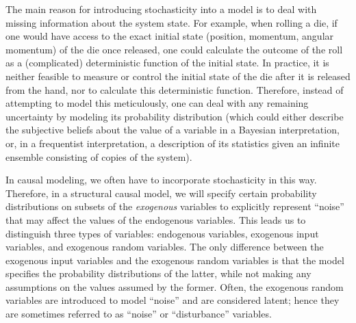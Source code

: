The main reason for introducing stochasticity into a model is to deal with
missing information about the system state. For example, when
rolling a die, if one would have access to the exact initial state (position, momentum,
angular momentum) of the die once released, one could calculate the outcome of the 
roll as a (complicated) deterministic function of the initial state. In
practice, it is neither feasible to measure or control the initial state of the die
after it is released from the hand, nor to calculate this deterministic function. 
Therefore, instead of attempting to model this
meticulously, one can deal with any remaining uncertainty by modeling its probability distribution
(which could either describe the subjective beliefs about the value of a variable
in a Bayesian interpretation, or, in a frequentist interpretation, a description of 
its statistics given an infinite ensemble consisting of copies of the system). 

In causal modeling, we often have to 
incorporate stochasticity in this way. Therefore, in a structural causal model,
we will specify certain probability distributions on subsets of the \emph{exogenous}
variables to explicitly represent ``noise'' that may affect the values of the
endogenous variables. This leads us to distinguish three types of variables:
endogenous variables, exogenous input variables, and exogenous random variables.
The only difference between the exogenous input variables and the exogenous
random variables is that the model specifies the probability distributions of the
latter, while not making any assumptions on the values assumed by the former.
Often, the exogenous random variables are introduced to model ``noise'' and 
are considered latent; hence they are sometimes referred to as ``noise'' or
``disturbance'' variables.


